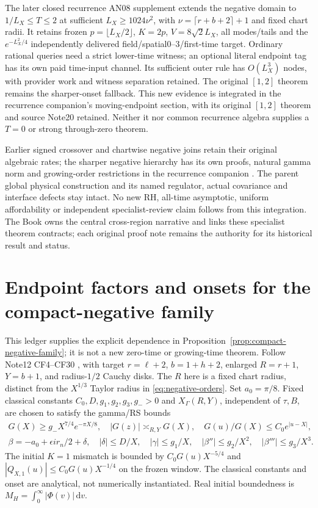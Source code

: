 \documentclass[11pt]{article}
\newcommand{\dd}{\,\mathrm d}
\numberwithin{equation}{section}
\begin{document}
The later closed recurrence AN08 supplement \cite{recurrence20} extends
the negative domain to $1/L_X\le T\le2$ at sufficient
$L_X\ge1024\nu^2$, with $\nu=\lceil r+b+2\rceil+1$ and fixed chart
radii. It retains frozen $p=\lfloor L_X/2\rfloor$, $K=2p$,
$V=8\sqrt2L_X$, all modes/tails and the $e^{-L_X^2/4}$ independently
delivered field/spatial0--3/first-time target. Ordinary rational queries
need a strict lower-time witness; an optional literal endpoint tag has
its own paid time-input channel. Its sufficient outer rule has
$O(L_X^3)$ nodes, with provider work and witness separation retained.
The original $[1,2]$ theorem remains the sharper-onset fallback. This
new evidence is integrated in the recurrence companion's moving-endpoint
section, with its original $[1,2]$ theorem and source Note20 retained. Neither it nor common recurrence algebra
supplies a $T=0$ or strong through-zero theorem.

Earlier signed crossover and chartwise negative joins retain their
original algebraic rates; the sharper negative hierarchy has its own
proofs, natural gamma norm and growing-order restrictions in the
recurrence companion \cite{recurrence}. The parent global physical
construction and its named regulator, actual covariance and interface
defects stay intact. No new RH, all-time asymptotic, uniform affordability
or independent specialist-review claim follows from this integration.
The Book \cite{book} owns the central cross-region narrative and links
these specialist theorem contracts; each original proof note remains
the authority for its historical result and status.

\clearpage
\appendix
\section{Endpoint factors and onsets for the compact-negative family}
\label{app:compact-endpoints}
This ledger supplies the explicit dependence in
Proposition~\ref{prop:compact-negative-family}; it is not a new
zero-time or growing-time theorem. Follow Note12 CF4--CF30
\cite{ansatz12}, with target \(r=\ell+2\), \(b=1+h+2\), enlarged
\(R=r+1\), \(Y=b+1\), and radius-\(1/2\) Cauchy disks.
The \(R\) here is a fixed chart radius, distinct from the
\(X^{1/3}\) Taylor radius in \eqref{eq:negative-orders}.
Set \(a_0=\pi/8\). Fixed classical constants
\(C_0,D,g_1,g_2,g_3,g_->0\) and \(X_\Gamma(R,Y)\), independent
of \(\tau,B\), are chosen to satisfy the gamma/RS bounds
\begin{gather}
 G(X)\ge g_-X^{7/4}e^{-\pi X/8},\quad |G(z)|\asymp_{R,Y}G(X),
 \quad G(u)/G(X)\le C_0e^{|u-X|},\\
 \beta=-a_0+\epsilon ir_n/2+\delta,\quad |\delta|\le D/X,
 \quad |\gamma|\le g_1/X,\quad |\beta''|\le g_2/X^2,
 \quad |\beta'''|\le g_3/X^3.
 \label{eq:compact-classical-data}
\end{gather}
The initial \(K=1\) mismatch is bounded by \(C_0G(u)X^{-5/4}\) and
\(|Q_{X,1}(u)|\le C_0G(u)X^{-1/4}\) on the frozen window.
The classical constants and onset are analytical, not numerically
instantiated. Real initial boundedness is
\(M_H=\int_0^\infty|\Phi(v)|\dd v\).
\end{document}
